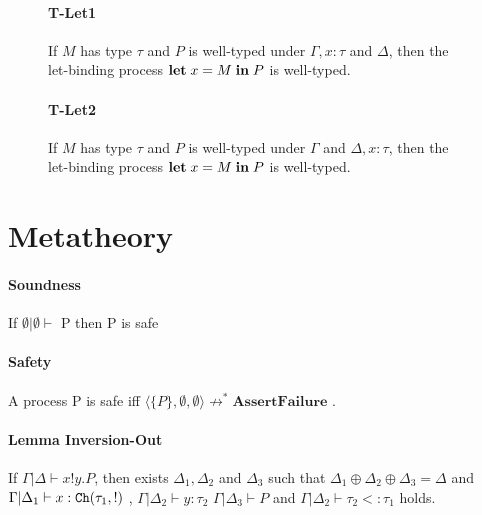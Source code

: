 \documentclass[master,english]{kuisthesis}
\theoremstyle{definition}
\begin{document}
\begin{figure}
\paragraph{T-Let1} If \(M\) has type \(\tau\) and \(P\) is well-typed under \(\Gamma, x{:}\tau\) and \(\Delta\), then the let-binding process \(\mathbf{let}\;{x} = {M}\;\mathbf{in}\;{P}\) is well-typed.

\paragraph{T-Let2} If \(M\) has type \(\tau\) and \(P\) is well-typed under \(\Gamma\) and \(\Delta, x{:}\tau\), then the let-binding process \(\mathbf{let}\;{x} = {M}\;\mathbf{in}\;{P}\) is well-typed.

\end{figure}




\section{Metatheory}\label{sec-structure}
\paragraph{Soundness}If $\emptyset | \emptyset \vdash$ P  then P is safe 

\paragraph{Safety} A process P is safe iff $\langle\{P\}, \emptyset, \emptyset\rangle \not\longrightarrow^* \textbf{AssertFailure} $ .


\paragraph{Lemma Inversion-Out}  If $\Gamma | \Delta \vdash x!y.P$, then  exists $\Delta_1 , \Delta_2 $ and $\Delta_3$ such that $\Delta_1 \oplus \Delta_2 \oplus \Delta_3=\Delta $ and $\Gamma|\Delta_1 \vdash x : {\tt Ch}({\tau_1, !})$ , $ \Gamma|\Delta_2  \vdash y : \tau_2 $  $
\Gamma|\Delta_3 \vdash P$ and $\Gamma | \Delta_2 \vdash \tau_2 <: \tau_1$  holds.
\end{document}
